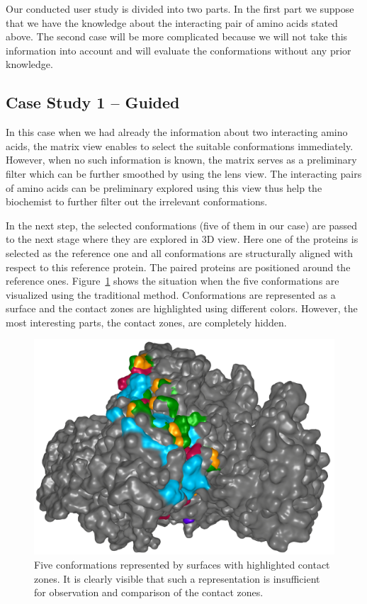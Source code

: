 \documentclass[journal]{vgtc}                %
\begin{document}
Our conducted user study is divided into two parts. In the first part we suppose that we have the knowledge about the interacting pair of amino acids stated above.
The second case will be more complicated because we will not take this information into account and will evaluate the conformations without any prior knowledge.

\subsection{Case Study 1 -- Guided}
In this case when we had already the information about two interacting amino acids, the matrix view enables to select the suitable conformations immediately.
However, when no such information is known, the matrix serves as a preliminary filter which can be further smoothed by using the lens view.
The interacting pairs of amino acids can be preliminary explored using this view thus help the biochemist to further filter out the irrelevant conformations.

In the next step, the selected conformations (five of them in our case) are passed to the next stage where they are explored in 3D view.
Here one of the proteins is selected as the reference one and all conformations are structurally aligned with respect to this reference protein.
The paired proteins are positioned around the reference ones.
Figure~\ref{fig:case1} shows the situation when the five conformations are visualized using the traditional method.
Conformations are represented as a surface and the contact zones are highlighted using different colors.
However, the most interesting parts, the contact zones, are completely hidden.

\begin{figure}[bt]
  \centering
  \includegraphics[width=0.7\columnwidth]{case1.png}
  \caption{Five conformations represented by surfaces with highlighted contact zones. It is clearly visible that such a representation is insufficient for observation and comparison of the contact zones.}
  \label{fig:case1}
\end{figure}
\end{document}
